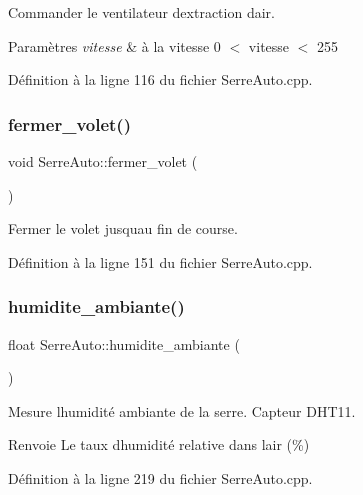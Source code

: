 Commander le ventilateur d\textquotesingle{}extraction d\textquotesingle{}air. 


\begin{DoxyParams}{Paramètres}
{\em vitesse} & à la vitesse 0 $<$ vitesse $<$ 255 \\
\hline
\end{DoxyParams}


Définition à la ligne 116 du fichier Serre\+Auto.\+cpp.

\mbox{\label{class_serre_auto_a0c99647189a01760ef61066d488fded8}} 
\subsubsection{fermer\+\_\+volet()}
{\footnotesize\ttfamily void Serre\+Auto\+::fermer\+\_\+volet (\begin{DoxyParamCaption}{ }\end{DoxyParamCaption})}



Fermer le volet jusqu\textquotesingle{}au fin de course. 



Définition à la ligne 151 du fichier Serre\+Auto.\+cpp.

\mbox{\label{class_serre_auto_accfa319e4d269ff8f62a6bbdddddc0d7}} 
\subsubsection{humidite\+\_\+ambiante()}
{\footnotesize\ttfamily float Serre\+Auto\+::humidite\+\_\+ambiante (\begin{DoxyParamCaption}{ }\end{DoxyParamCaption})}



Mesure l\textquotesingle{}humidité ambiante de la serre. Capteur D\+H\+T11. 

\begin{DoxyReturn}{Renvoie}
Le taux d\textquotesingle{}humidité relative dans l\textquotesingle{}air (\%) 
\end{DoxyReturn}


Définition à la ligne 219 du fichier Serre\+Auto.\+cpp.

\mbox{\label{class_serre_auto_a463dd7d09995958c7a6259e990f351b4}} 
